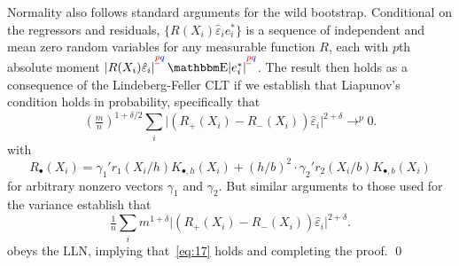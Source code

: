 \documentclass[12pt,fleqn]{article}
\providecommand{\DIFadd}[1]{{\protect\color{blue}\uwave{#1}}} %
\providecommand{\DIFdel}[1]{{\protect\color{red}\sout{#1}}}                      %
\providecommand{\DIFaddbegin}{} %
\providecommand{\DIFaddend}{} %
\providecommand{\DIFdelbegin}{} %
\providecommand{\DIFdelend}{} %
\begin{document}
Normality also follows standard arguments for the wild
bootstrap. Conditional on the regressors and residuals,
$\{R(X_i) \hat\varepsilon_i e_i^* \}$ is a sequence of independent and
mean zero random variables for any measurable function $R$, each with
\DIFdelbegin \DIFdel{$p$}\DIFdelend \DIFaddbegin \DIFadd{$q$}\DIFaddend th absolute moment
$\lvert R(X_i) \hat\varepsilon_i
\rvert^{\DIFdelbegin \DIFdel{p} \DIFdelend \DIFaddbegin \DIFadd{q} \DIFaddend}
\E \lvert e_i^* \rvert^{\DIFdelbegin \DIFdel{p} \DIFdelend \DIFaddbegin \DIFadd{q} \DIFaddend}$.
The result then holds as a consequence of the Lindeberg-Feller CLT if
we establish that Liapunov's condition holds in probability, specifically that
\begin{equation}\label{eq:17}
  (\tfrac{m}{n})^{1+\delta/2} \sum_{i} \lvert (R_+(X_i) - R_-(X_i))
  \hat\varepsilon_i \rvert^{2+\delta} \to^{p} 0.
\end{equation}
with
\begin{equation*}
  R_\bullet(X_i) = \gamma_1' r_1(X_i/h) K_{\bullet,h}(X_i) +
  (h/b)^2 \cdot \gamma_2' r_2(X_i/b) K_{\bullet,b}(X_i)
\end{equation*}
for arbitrary nonzero vectors $\gamma_1$ and $\gamma_2$.
\citep[See, for example,][Proposition 2.27 and Theorem 23.4.]{VDV00}
But similar arguments to those used for the variance establish
that
\begin{equation}\label{eq:17}
  \tfrac{1}{n} \sum_{i} m^{1+\delta} \lvert (R_+(X_i) - R_-(X_i))
  \hat\varepsilon_i \rvert^{2+\delta}.
\end{equation}
obeys the LLN, implying that~\eqref{eq:17} holds and completing the proof. \qed

\clearpage


\end{document}
